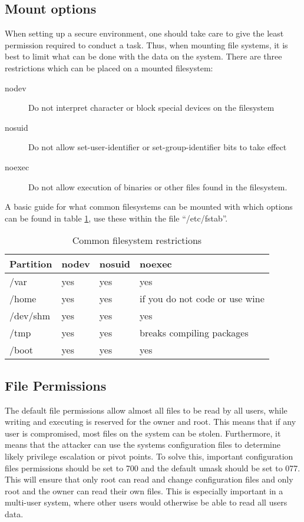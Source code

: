 		\subsection{Mount options}
			When setting up a secure environment, one should take care to give the least permission required to conduct a task.
			Thus, when mounting file systems, it is best to limit what can be done with the data on the system.
			There are three restrictions which can be placed on a mounted filesystem:
			\begin{description}
				\item[nodev] Do not interpret character or block special devices on the filesystem
				\item[nosuid] Do not allow set-user-identifier or set-group-identifier bits to take effect
				\item[noexec] Do not allow execution of binaries or other files found in the filesystem.
			\end{description}
			A basic guide for what common filesystems can be mounted with which options can be found in table \ref{tab:mountOptions}, use these within the file ``/etc/fstab''.
			\begin{table}[htb]
				\centering
				\begin{adjustbox}{max width=1\textwidth}
				\begin{tabular}{ l  l  l  l }
					\toprule
					\textbf{Partition} & \textbf{nodev} & \textbf{nosuid} & \textbf{noexec} \\
					\toprule
					/var  &		yes &	yes &	yes \\
					/home &		yes &	yes &	if you do not code or use wine \\
					/dev/shm &	yes &	yes &	yes \\
					/tmp &		yes &	yes &	breaks compiling packages \\
					/boot &		yes &	yes &	yes \\
					\bottomrule
				\end{tabular}
			\end{adjustbox}
				\caption{Common filesystem restrictions}
				\label{tab:mountOptions}
			\end{table}
			\subsection{File Permissions}
				The default file permissions allow almost all files to be read by all users, while writing and executing is reserved for the owner and root.
				This means that if any user is compromised, most files on the system can be stolen.
				Furthermore, it means that the attacker can use the systems configuration files to determine likely privilege escalation or pivot points.
				To solve this, important configuration files permissions should be set to 700 and the default umask should be set to 077.
				This will ensure that only root can read and change configuration files and only root and the owner can read their own files.
				This is especially important in a multi-user system, where other users would otherwise be able to read all users data.
